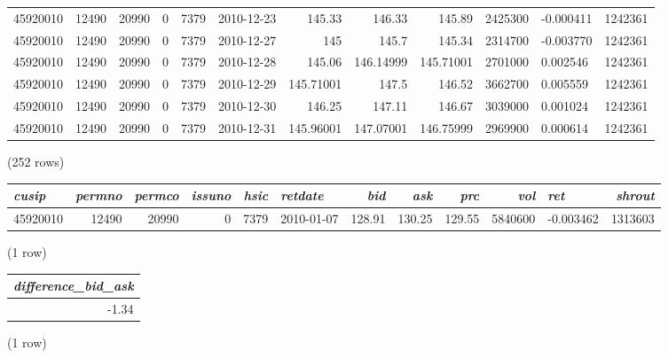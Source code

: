 \begin{tabular}{l | r | r | r | r | l | r | r | r | r | l | r}
45920010 & 12490 & 20990 & 0 & 7379 & 2010-12-23 & 145.33 & 146.33 & 145.89 & 2425300 & -0.000411 & 1242361 \\
45920010 & 12490 & 20990 & 0 & 7379 & 2010-12-27 & 145 & 145.7 & 145.34 & 2314700 & -0.003770 & 1242361 \\
45920010 & 12490 & 20990 & 0 & 7379 & 2010-12-28 & 145.06 & 146.14999 & 145.71001 & 2701000 & 0.002546 & 1242361 \\
45920010 & 12490 & 20990 & 0 & 7379 & 2010-12-29 & 145.71001 & 147.5 & 146.52 & 3662700 & 0.005559 & 1242361 \\
45920010 & 12490 & 20990 & 0 & 7379 & 2010-12-30 & 146.25 & 147.11 & 146.67 & 3039000 & 0.001024 & 1242361 \\
45920010 & 12490 & 20990 & 0 & 7379 & 2010-12-31 & 145.96001 & 147.07001 & 146.75999 & 2969900 & 0.000614 & 1242361 \\
\end{tabular}

\noindent (252 rows) \\

\begin{tabular}{l | r | r | r | r | l | r | r | r | r | l | r}
\textit{cusip} & \textit{permno} & \textit{permco} & \textit{issuno} & \textit{hsic} & \textit{retdate} & \textit{bid} & \textit{ask} & \textit{prc} & \textit{vol} & \textit{ret} & \textit{shrout} \\
\hline
45920010 & 12490 & 20990 & 0 & 7379 & 2010-01-07 & 128.91 & 130.25 & 129.55 & 5840600 & -0.003462 & 1313603 \\
\end{tabular}

\noindent (1 row) \\

\begin{tabular}{r}
\textit{difference\_bid\_ask} \\
\hline
-1.34 \\
\end{tabular}

\noindent (1 row) \\

